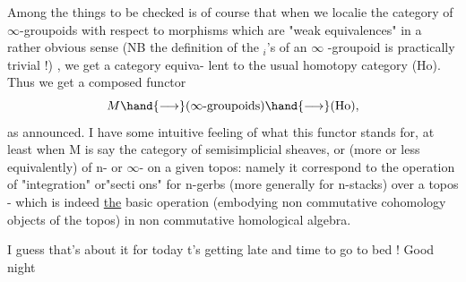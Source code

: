 Among the things to be checked is of course that when we localie
the category of \deleted{(}$\infty$-groupoids with respect to morphisms which are "weak
equivalences" in a rather obvious sense (NB the definition of the \hand{$\pi$}$_i$'s
of an $\infty$ -groupoid is practically trivial !) , we get a category equiva-%
lent to the usual homotopy category (Ho). Thus we get a composed functor
\[ M \hand{\longrightarrow} (\infty\text{-groupoids}) \hand{\longrightarrow} \text{(Ho)} , \]
as announced. I have some intuitive feeling of what this functor stands
for, at least when M is say the category of semisimplicial sheaves, or
(more or less equivalently) of n- or $\infty$- on a given
topos: namely it  correspond to the operation of "integration" or"secti\hand{-}
ons" for n-gerbs (more generally for n-stacks) over a topos - which is
indeed \uline{the} basic operation (embodying non commutative cohomology objects
of the topos) in non commutative homological algebra.

I guess that's about it for today\hand{,} t's getting late and time to go
to bed ! Good night \hand{!}

